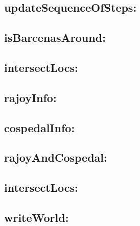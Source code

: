 \documentclass[11pt]{article}
\begin{document}
\subsection{updateSequenceOfSteps:}
\subsection{isBarcenasAround:}
\subsection{intersectLocs:}
\subsection{rajoyInfo:}
\subsection{cospedalInfo:}
\subsection{rajoyAndCospedal:}
\subsection{intersectLocs:}
\subsection{writeWorld:}
\end{document}
